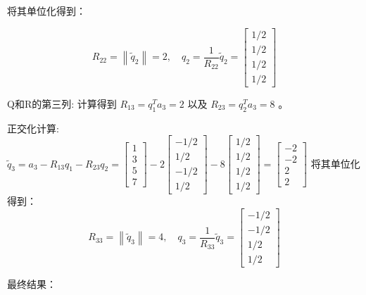 \begin{example}
将其单位化得到：

$$
R_{22}=\left\|\tilde{q}_{2}\right\|=2, \quad q_{2}=\frac{1}{R_{22}} \tilde{q}_{2}=\left[\begin{array}{c}
1 / 2 \\
1 / 2 \\
1 / 2 \\
1 / 2
\end{array}\right]
$$

Q和R的第三列:
计算得到 $R_{13}=q_{1}^{T} a_{3}=2$ 以及 $R_{23}=q_{2}^{T} a_{3}=8$ 。

正交化计算:
$\tilde{q}_{3}=a_{3}-R_{13} q_{1}-R_{23} q_{2}=\left[\begin{array}{l}1 \\ 3 \\ 5 \\ 7\end{array}\right]-2\left[\begin{array}{r}-1 / 2 \\ 1 / 2 \\ -1 / 2 \\ 1 / 2\end{array}\right]-8\left[\begin{array}{l}1 / 2 \\ 1 / 2 \\ 1 / 2 \\ 1 / 2\end{array}\right]=\left[\begin{array}{r}-2 \\ -2 \\ 2 \\ 2\end{array}\right]$
将其单位化得到：
$$
R_{33}=\left\|\tilde{q}_{3}\right\|=4, \quad q_{3}=\frac{1}{R_{33}} \tilde{q}_{3}=\left[\begin{array}{c}
-1 / 2 \\
-1 / 2 \\
1 / 2 \\
1 / 2
\end{array}\right]
$$

最终结果：


\end{example}
